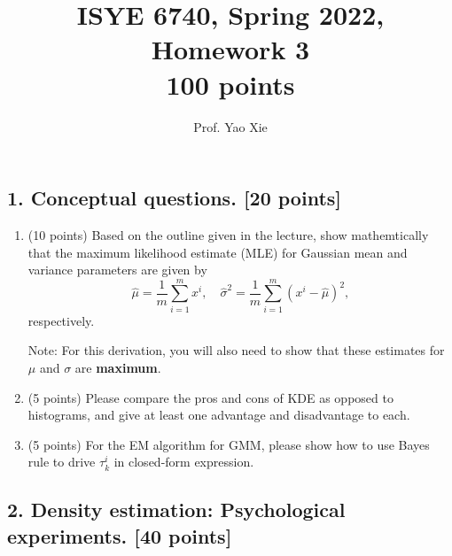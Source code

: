 \documentclass[12pt]{article}
\begin{document}
\title{ISYE 6740, Spring 2022, Homework 3\\{\small 100 points}}
\author{Prof. Yao Xie}
\date{}
\maketitle


\subsection*{1. Conceptual questions. [20 points]}

\begin{enumerate}

\item (10 points) Based on the outline given in the lecture, show mathemtically that the maximum likelihood estimate (MLE) for Gaussian mean and variance parameters are given by 
\[
\hat \mu = \frac 1 m \sum_{i=1}^m x^i, \quad \hat \sigma^2 = \frac 1 m \sum_{i=1}^m (x^i - \hat \mu)^2,
\]
respectively.

Note: For this derivation, you will also need to show that these estimates for $\mu$ and $\sigma$ are \textbf{maximum}.

\item (5 points) Please compare the pros and cons of KDE as opposed to histograms, and give at least one advantage and disadvantage to each.

\item (5 points) For the EM algorithm for GMM, please show how to use Bayes rule to drive $\tau_k^i$ in closed-form expression. 

\end{enumerate}

\subsection*{2. Density estimation: Psychological experiments. [40 points]}
\end{document}
